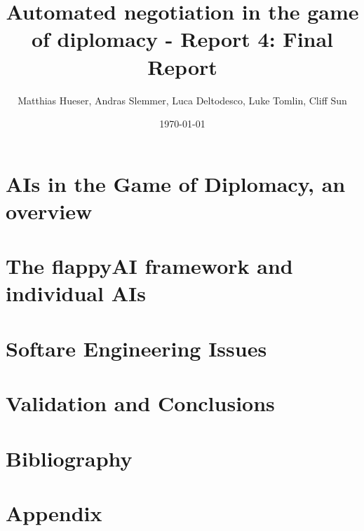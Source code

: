 \documentclass[11pt]{article}
\title{Automated negotiation in the game of diplomacy - Report 4: Final Report}
\author{Matthias Hueser, Andras Slemmer, Luca Deltodesco, Luke Tomlin, Cliff Sun}
\date{\today}
\begin{document}
\maketitle

\section{AIs in the Game of Diplomacy, an overview}
\section{The flappyAI framework and individual AIs}
\section{Softare Engineering Issues}
\section{Validation and Conclusions}
\section{Bibliography}
\section{Appendix}
\end{document}
